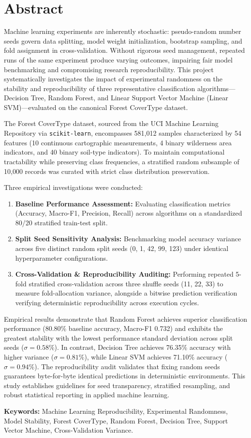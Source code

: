 \chapter*{Abstract}

Machine learning experiments are inherently stochastic: pseudo-random number seeds govern data splitting, model weight initialization, bootstrap sampling, and fold assignment in cross-validation. Without rigorous seed management, repeated runs of the same experiment produce varying outcomes, impairing fair model benchmarking and compromising research reproducibility. This project systematically investigates the impact of experimental randomness on the stability and reproducibility of three representative classification algorithms---Decision Tree, Random Forest, and Linear Support Vector Machine (Linear SVM)---evaluated on the canonical Forest CoverType dataset.

The Forest CoverType dataset, sourced from the UCI Machine Learning Repository via \texttt{scikit-learn}, encompasses 581,012 samples characterized by 54 features (10 continuous cartographic measurements, 4 binary wilderness area indicators, and 40 binary soil-type indicators). To maintain computational tractability while preserving class frequencies, a stratified random subsample of 10,000 records was curated with strict class distribution preservation.

Three empirical investigations were conducted:
\begin{enumerate}
    \item \textbf{Baseline Performance Assessment:} Evaluating classification metrics (Accuracy, Macro-F1, Precision, Recall) across algorithms on a standardized 80/20 stratified train-test split.
    \item \textbf{Split Seed Sensitivity Analysis:} Benchmarking model accuracy variance across five distinct random split seeds (0, 1, 42, 99, 123) under identical hyperparameter configurations.
    \item \textbf{Cross-Validation \& Reproducibility Auditing:} Performing repeated 5-fold stratified cross-validation across three shuffle seeds (11, 22, 33) to measure fold-allocation variance, alongside a bitwise prediction verification verifying deterministic reproducibility across execution cycles.
\end{enumerate}

Empirical results demonstrate that Random Forest achieves superior classification performance (80.80\% baseline accuracy, Macro-F1 0.732) and exhibits the greatest stability with the lowest performance standard deviation across split seeds ($\sigma = 0.58\%$). In contrast, Decision Tree achieves 76.35\% accuracy with higher variance ($\sigma = 0.81\%$), while Linear SVM achieves 71.10\% accuracy ($\sigma = 0.94\%$). The reproducibility audit validates that fixing random seeds guarantees byte-for-byte identical predictions in deterministic environments. This study establishes guidelines for seed transparency, stratified resampling, and robust statistical reporting in applied machine learning.

\vspace{1.0cm}

\noindent \textbf{Keywords:} Machine Learning Reproducibility, Experimental Randomness, Model Stability, Forest CoverType, Random Forest, Decision Tree, Support Vector Machine, Cross-Validation Variance.
